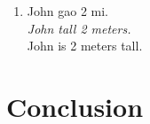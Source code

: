 \documentclass{ctexart}
\begin{document}
\begin{enumerate}[resume]
    \item \label{transitive_example}
    John gao 2 mi. \\
    \textit{John tall 2 meters.} \\
    John is 2 meters tall.
\end{enumerate}


\section{Conclusion}

\newpage

\printbibliography
\end{document}
